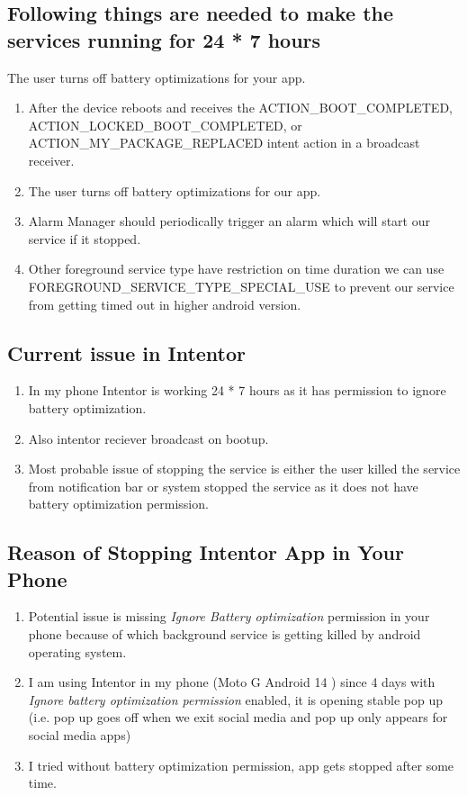 \documentclass[12pt]{article}
\begin{document}
    \subsection{Following things are needed to make the services running for 24 * 7 hours}The user turns off battery optimizations for your app.
    
    
    \begin{enumerate}
        \item After the device reboots and receives the ACTION\_BOOT\_COMPLETED, ACTION\_LOCKED\_BOOT\_COMPLETED, or ACTION\_MY\_PACKAGE\_REPLACED intent action in a broadcast receiver.
        \item The user turns off battery optimizations for our app.
        \item Alarm Manager should periodically trigger an alarm which will start our service if it stopped.
        \item Other foreground service type have restriction on time duration we can use FOREGROUND\_SERVICE\_TYPE\_SPECIAL\_USE to prevent our service from getting timed out in higher android version.
    \end{enumerate}
    
    \subsection{Current issue in Intentor}
    \begin{enumerate}
        \item In my phone Intentor is working 24 * 7 hours as it has permission to ignore battery optimization.
        \item Also intentor reciever broadcast on bootup.
        \item Most probable issue of stopping the service is either the user killed the service from notification bar or system stopped the service as it does not have battery optimization permission.
    \end{enumerate}
    \subsection{Reason of Stopping Intentor App in Your Phone}
    \begin{enumerate}
        \item Potential issue is missing \textit{Ignore Battery optimization} permission in your phone because of which background service is getting killed by android operating system.
        \item I am using Intentor in my phone (Moto G Android 14 ) since 4 days with \textit{Ignore battery optimization permission} enabled, it is opening stable pop up (i.e. pop up goes off when we exit social media and pop up only appears for social media apps)
        \item I tried without battery optimization permission, app gets stopped after some time.
    \end{enumerate}
\end{document}
